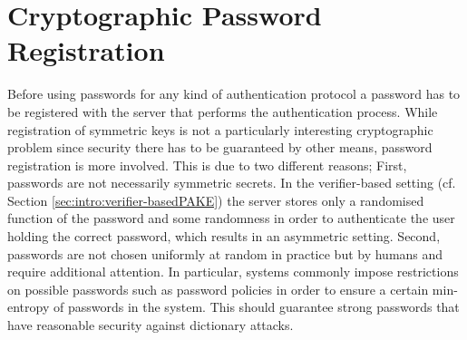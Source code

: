 
\section{Cryptographic Password Registration}\label{sec:intro:registration}
Before using passwords for any kind of authentication protocol a password has to be registered with the server that performs the authentication process.
While registration of symmetric keys is not a particularly interesting cryptographic problem since security there has to be guaranteed by other means, password registration is more involved.
This is due to two different reasons;
First, passwords are not necessarily symmetric secrets.
In the verifier-based setting (cf. Section \ref{sec:intro:verifier-basedPAKE}) the server stores only a randomised function of the password and some randomness in order to authenticate the user holding the correct password, which results in an asymmetric setting.
Second, passwords are not chosen uniformly at random in practice but by humans and require additional attention.
In particular, systems commonly impose restrictions on possible passwords such as password policies in order to ensure a certain min-entropy of passwords in the system.
This should guarantee strong passwords that have reasonable security against dictionary attacks.

